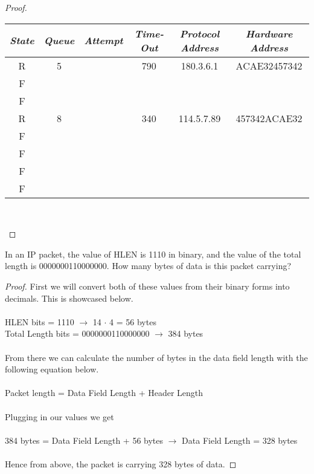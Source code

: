 \documentclass[12pt]{article}
\newenvironment{exercise}[2][Exercise]{\begin{trivlist}
\item[\hskip \labelsep {\bfseries #1}\hskip \labelsep {\bfseries #2.}]}{\end{trivlist}}
\begin{document}
\begin{proof}
\begin{center}
\begin{tabular}{|c|c|c|c|c|c|}
    \hline
   \textit{State} & \textit{Queue} & \textit{Attempt} & \textit{Time-Out} & \textit{Protocol Address} & \textit{Hardware Address} \\
   \hline 
    R & 5 & & 790 & 180.3.6.1 & ACAE32457342 \\ 
    \hline 
    F &  & & & & \\ 
    \hline 
    F & & & & & \\
    \hline 
    R & 8 & & 340 & 114.5.7.89 & 457342ACAE32 \\
    \hline
    F & & & & & \\
    \hline
    F & & & & & \\
    \hline 
    F & & & & & \\
    \hline 
    F & & & & & \\ 
    \hline 
\end{tabular}
\\
\end{center}

\end{proof}

\begin{exercise}{6}
In an IP packet, the value of HLEN is 1110 in binary, and the value of the total length is
0000000110000000. How many bytes of data is this packet carrying?
\end{exercise}

\begin{proof}

First we will convert both of these values from their binary forms into decimals. This is showcased below. \\ \\
HLEN bits = 1110 $\longrightarrow$ 14 $\cdot$ 4 = 56 bytes\\ 
Total Length bits = 0000000110000000 $\longrightarrow$ 384 bytes\\ \\
From there we can calculate the number of bytes in the data field length with the following equation below. \\ \\
Packet length = Data Field Length + Header Length \\ \\ 
Plugging in our values we get \\ \\ 
384 bytes = Data Field Length + 56 bytes $\longrightarrow$ Data Field Length = 328 bytes \\ \\
Hence from above, the packet is carrying 328 bytes of data. 
\end{proof}
\end{document}

